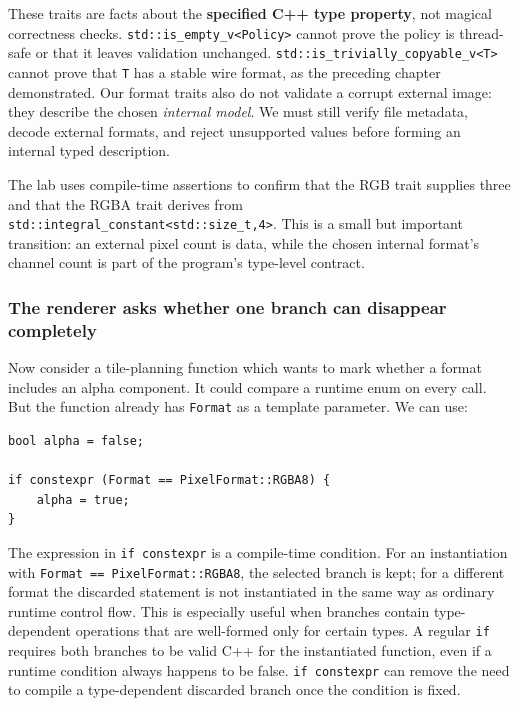 These traits are facts about the \textbf{specified C++ type property}, not magical correctness checks. \texttt{std::is\_empty\_v\textless{}Policy\textgreater{}} cannot prove the policy is thread-safe or that it leaves validation unchanged. \texttt{std::is\_trivially\_copyable\_v\textless{}T\textgreater{}} cannot prove that \texttt{T} has a stable wire format, as the preceding chapter demonstrated. Our format traits also do not validate a corrupt external image: they describe the chosen \emph{internal model}. We must still verify file metadata, decode external formats, and reject unsupported values before forming an internal typed description.

The lab uses compile-time assertions to confirm that the RGB trait supplies three and that the RGBA trait derives from \texttt{std::integral\_constant\textless{}std::size\_t,4\textgreater{}}. This is a small but important transition: an external pixel count is data, while the chosen internal format's channel count is part of the program's type-level contract.

\subsubsection{The renderer asks whether one branch can disappear completely}\label{the-renderer-asks-whether-one-branch-can-disappear-completely}

Now consider a tile-planning function which wants to mark whether a format includes an alpha component. It could compare a runtime enum on every call. But the function already has \texttt{Format} as a template parameter. We can use:

\begin{verbatim}
bool alpha = false;

if constexpr (Format == PixelFormat::RGBA8) {
    alpha = true;
}
\end{verbatim}

The expression in \texttt{if\ constexpr} is a compile-time condition. For an instantiation with \texttt{Format\ ==\ PixelFormat::RGBA8}, the selected branch is kept; for a different format the discarded statement is not instantiated in the same way as ordinary runtime control flow. This is especially useful when branches contain type-dependent operations that are well-formed only for certain types. A regular \texttt{if} requires both branches to be valid C++ for the instantiated function, even if a runtime condition always happens to be false. \texttt{if\ constexpr} can remove the need to compile a type-dependent discarded branch once the condition is fixed.

